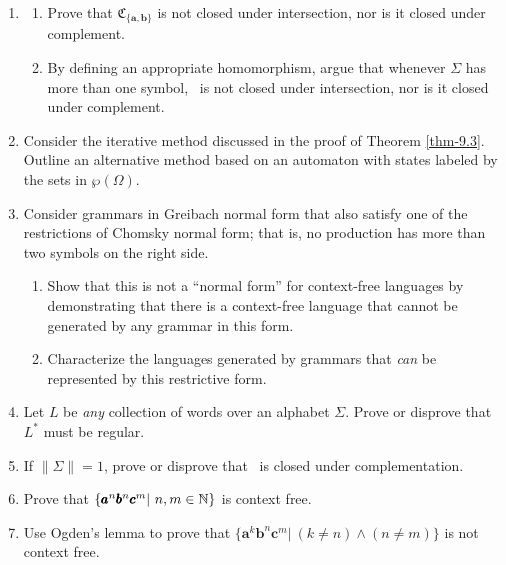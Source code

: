 \begin{enumerate}[{9.}1.]
\item \begin{enumerate}
\item Prove that $\mathfrak{C}_{\{\pmb{a},\pmb{b}\}}$ is not closed under
intersection, nor is it closed under complement.
\item By defining an appropriate homomorphism, argue that whenever $\Sigma$ has
more than one symbol, \CSIG\ is not closed under intersection, nor is it closed
under complement.
\end{enumerate}

\item Consider the iterative method discussed in the proof of Theorem \ref{thm-9.3}.
Outline an alternative method based on an automaton with states labeled by the
sets in $\wp(\Omega)$.

\item Consider grammars in Greibach normal form that also satisfy one of the
restrictions of Chomsky normal form; that is, no production has more than two
symbols on the right side.
\begin{enumerate}
\item Show that this is not a ``normal form'' for context-free languages by
demonstrating that there is a context-free language that cannot be generated by
any grammar in this form.
\item Characterize the languages generated by grammars that \emph{can} be represented
by this restrictive form.
\end{enumerate}

\item Let $L$ be \emph{any} collection of words over an alphabet $\Sigma$. Prove
or disprove that $L^*$ must be regular.

\item If $\|\Sigma\|=1$, prove or disprove that \CSIG\ is closed under
complementation.

\item Prove that $\{\pmb{a}^n\pmb{b}^n\pmb{c}^m|\ n,m\in\mathbb{N}\}$ is context free.

\item Use Ogden's lemma to prove that $\{\pmb{a}^k\pmb{b}^n\pmb{c}^m|\ (k \not= n)
\wedge (n \not= m)\}$ is not context free.
\end{enumerate}

